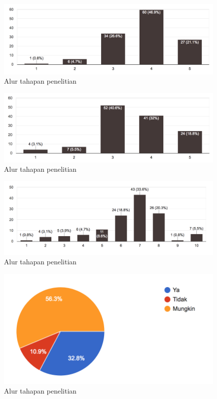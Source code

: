 \begin{figure}
	\includegraphics[width=\linewidth]{pics/menikmati-cara-belajar-sekarang}
	\caption{Alur tahapan penelitian}
	\centering
\end{figure}
\begin{figure}
	\includegraphics[width=\linewidth]{pics/mudah-memahami}
	\caption{Alur tahapan penelitian}
	\centering
\end{figure}
\begin{figure}
	\includegraphics[width=\linewidth]{pics/nilai-pemograman}
	\caption{Alur tahapan penelitian}
	\centering
\end{figure}
\begin{figure}
	\includegraphics[width=\linewidth]{pics/passion-pemograman}
	\caption{Alur tahapan penelitian}
	\centering
\end{figure}
